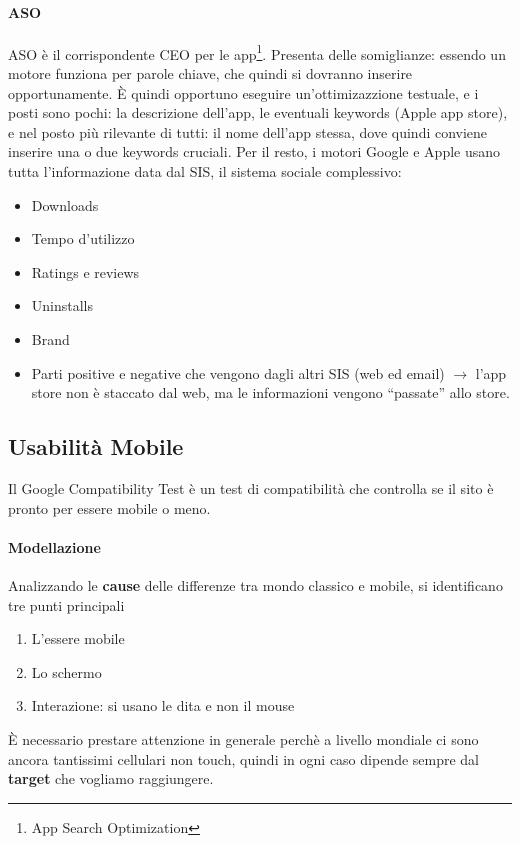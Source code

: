 \paragraph*{ASO}ASO \`e il corrispondente CEO per le app\footnote{App Search Optimization}. Presenta delle somiglianze: essendo un motore funziona per parole chiave, che quindi si dovranno inserire opportunamente. \`E quindi opportuno eseguire un'ottimizazzione testuale, e i posti sono pochi: la descrizione dell'app, le eventuali keywords (Apple app store), e nel posto pi\`u rilevante di tutti: il nome dell'app stessa, dove quindi conviene inserire una o due keywords cruciali. Per il resto, i motori Google e Apple usano tutta l'informazione data dal SIS, il sistema sociale complessivo:
\begin{itemize}

\item Downloads
\item Tempo d'utilizzo
\item Ratings e reviews
\item Uninstalls
\item Brand
\item Parti positive e negative che vengono dagli altri SIS (web ed email) $\to$ l'app store non \`e staccato dal web, ma le informazioni vengono ``passate'' allo store.
  
\end{itemize}

\subsection{Usabilit\`a Mobile}

Il Google Compatibility Test \`e un test di compatibilit\`a che controlla se il sito \`e pronto per essere mobile o meno.

\paragraph*{Modellazione}Analizzando le \textbf{cause} delle differenze tra mondo classico e mobile, si identificano tre punti principali
\begin{enumerate}
  
\item L'essere mobile
\item Lo schermo
\item Interazione: si usano le dita e non il mouse
  
\end{enumerate}
\`E necessario prestare attenzione in generale perch\`e a livello mondiale ci sono ancora tantissimi cellulari non touch, quindi in ogni caso dipende sempre dal \textbf{target} che vogliamo raggiungere.


